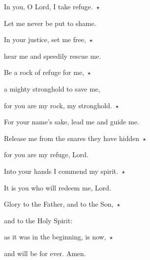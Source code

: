 \noindent In you, O Lord, I take refuge.~$\star$~\nopagebreak

Let me never be put to shame.

\noindent In your justice, set me free,~$\star$~\nopagebreak

hear me and speedily rescue me.

\noindent Be a rock of refuge for me,~$\star$~\nopagebreak

a mighty stronghold to save me,

\noindent for you are my rock, my stronghold.~$\star$~\nopagebreak

For your name’s sake, lead me and guide me.

\noindent Release me from the snares they have hidden~$\star$~\nopagebreak

for you are my refuge, Lord.

\noindent Into your hands I commend my spirit.~$\star$~\nopagebreak

It is you who will redeem me, Lord.

\noindent Glory to the Father, and to the Son,~$\star$~\nopagebreak

and to the Holy Spirit:

\noindent as it was in the beginning, is now,~$\star$~\nopagebreak

and will be for ever. Amen.
